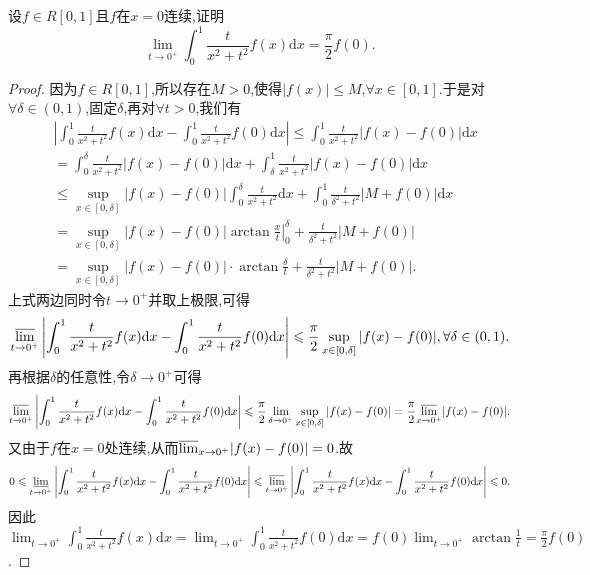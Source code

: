\documentclass[../../main.tex]{subfiles}
\begin{document}
\begin{example}[$\,\,$Possion核]\label{example:Possion核}
设\(f\in R[0,1]\)且\(f\)在\(x = 0\)连续,证明
\[
\lim_{t\rightarrow 0^+} \int_0^1{\frac{t}{x^2+t^2}f(x)\mathrm{d}x}=\frac{\pi}{2}f(0).
\]
\end{example}
\begin{proof}
因为\(f\in R[0,1]\),所以存在\(M > 0\),使得\(\vert f(x)\vert\leqslant M\),\(\forall x\in [0,1]\).于是对\(\forall\delta\in(0,1)\),固定\(\delta\),再对\(\forall t > 0\),我们有
\begin{align*}
&\left|\int_0^1\frac{t}{x^2 + t^2}f(x)\mathrm{d}x - \int_0^1\frac{t}{x^2 + t^2}f(0)\mathrm{d}x\right| \leqslant \int_0^1\frac{t}{x^2 + t^2}\vert f(x) - f(0)\vert \mathrm{d}x\\
&= \int_0^{\delta}\frac{t}{x^2 + t^2}\vert f(x) - f(0)\vert \mathrm{d}x + \int_{\delta}^1\frac{t}{x^2 + t^2}\vert f(x) - f(0)\vert \mathrm{d}x\\
&\leqslant \sup_{x\in[0,\delta]}\vert f(x) - f(0)\vert\int_0^{\delta}\frac{t}{x^2 + t^2}\mathrm{d}x + \int_0^1\frac{t}{\delta^2 + t^2}\vert M + f(0)\vert \mathrm{d}x\\
&= \sup_{x\in[0,\delta]}\vert f(x) - f(0)\vert\left.\arctan\frac{x}{t}\right|_{0}^{\delta} + \frac{t}{\delta^2 + t^2}\vert M + f(0)\vert\\
&= \sup_{x\in[0,\delta]}\vert f(x) - f(0)\vert\cdot\arctan\frac{\delta}{t} + \frac{t}{\delta^2 + t^2}\vert M + f(0)\vert.
\end{align*}
上式两边同时令\(t\rightarrow 0^+\)并取上极限,可得
\[
{\varlimsup_{t\rightarrow 0^+}}\left|\int_0^1\frac{t}{x^2 + t^2}f(x)\mathrm{d}x - \int_0^1\frac{t}{x^2 + t^2}f(0)\mathrm{d}x\right| \leqslant \frac{\pi}{2}\sup_{x\in[0,\delta]}\vert f(x) - f(0)\vert, \forall\delta\in(0,1).
\]
再根据\(\delta\)的任意性,令\(\delta\rightarrow 0^+\)可得
\[
{\varlimsup_{t\rightarrow 0^+}}\left|\int_0^1\frac{t}{x^2 + t^2}f(x)\mathrm{d}x - \int_0^1\frac{t}{x^2 + t^2}f(0)\mathrm{d}x\right| \leqslant \frac{\pi}{2}\lim_{\delta\rightarrow 0^+}\sup_{x\in[0,\delta]}\vert f(x) - f(0)\vert = \frac{\pi}{2}{\varlimsup_{x\rightarrow 0^+}}\vert f(x) - f(0)\vert.
\]
又由于\(f\)在\(x = 0\)处连续,从而\({\varlimsup_{x\rightarrow 0^+}}\vert f(x) - f(0)\vert = 0\).故
\[
0\leqslant \underset{t\rightarrow 0^+}{{\varliminf }}\left| \int_0^1{\frac{t}{x^2+t^2}f(x)\mathrm{d}x}-\int_0^1{\frac{t}{x^2+t^2}f(0)\mathrm{d}x} \right|\leqslant {\varlimsup_{t\rightarrow 0^+} }\left| \int_0^1{\frac{t}{x^2+t^2}f(x)\mathrm{d}x}-\int_0^1{\frac{t}{x^2+t^2}f(0)\mathrm{d}x} \right|\leqslant 0.
\]
因此\(\lim_{t\rightarrow 0^+}\int_0^1\frac{t}{x^2 + t^2}f(x)\mathrm{d}x = \lim_{t\rightarrow 0^+}\int_0^1\frac{t}{x^2 + t^2}f(0)\mathrm{d}x = f(0)\lim_{t\rightarrow 0^+}\arctan\frac{1}{t} = \frac{\pi}{2}f(0)\).

\end{proof}
\end{document}
